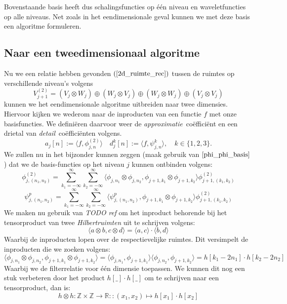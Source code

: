 \documentclass[11pt]{uvamath}
\newcommand{\R}{\mathbb{R}}
\newcommand{\Z}{\mathbb{Z}}
\theoremstyle{plain}
\theoremstyle{definition}
\theoremstyle{remark}
\newcommand{\inpr}[2]{\langle #1 , #2 \rangle}
\begin{document}
Bovenstaande basis heeft dus schalingsfuncties op \'e\'en niveau en waveletfuncties op alle niveaus. Net zoals in het eendimensionale geval kunnen we met deze basis een algoritme formuleren.

\subsection{Naar een tweedimensionaal algoritme}
Nu we een relatie hebben gevonden $(\ref{2d_ruimte_rec})$ tussen de ruimtes op verschillende
niveau's volgens
\[
V_{j+1}^{(2)} = (V_j\otimes W_j) \oplus (W_j\otimes V_j) \oplus
(W_j\otimes W_j) \oplus (V_j\otimes V_j)
\]
kunnen we het eendimensionale algoritme uitbreiden naar twee dimensies.
Hiervoor kijken we wederom naar de inproducten van een functie $f$ met
onze basisfuncties.
We defini\"eren daarvoor weer de \emph{approximatie}~co\"effici\"ent en een drietal
van \emph{detail}~co\"effici\"enten volgens.
\[
a_j[n] := \langle f, \phi^{(2)}_{j,n} \rangle \quad d^k_j[n] := \langle f, \psi^k_{j,n} \rangle ,\quad k \in \{1,2,3\}.
\]
We zullen nu in het bijzonder kunnen zeggen (maak gebruik van $\ref{phi_phi_basis}$)
dat we de basis-functies op het niveau $j$ kunnen ontbinden volgens:
\begin{equation}
  \label{phi_phi_som}
  \phi^{(2)}_{j,(n_1,n_2)} = \sum_{k_1=-\infty}^\infty \sum_{k_2=-\infty}^\infty
  \inpr{\phi_{j,n_1}\otimes\phi_{j,n_2}}{\phi_{j+1,k_1}\otimes\phi_{j+1,k_2}}
  \phi^{(2)}_{j+1,(k_1,k_2)}
\end{equation}
\begin{equation}
  \label{psi_k_som}
  \psi^{p}_{j,(n_1,n_2)} = \sum_{k_1=-\infty}^\infty \sum_{k_2=-\infty}^\infty
  \inpr{\psi^p_{j,(n_1,n_2)}}{\phi_{j+1,k_1}\otimes\phi_{j+1,k_2}}
  \phi^{(2)}_{j+1,(k_1,k_2)}
\end{equation}
We maken nu gebruik van \emph{TODO ref} om het inproduct behorende bij het tensorproduct
van twee \emph{Hilbertruimten} uit te schrijven volgens:
\[
\inpr{a\otimes b}{c\otimes d} = \inpr{a}{c}\cdot \inpr{b}{d}
\]
Waarbij de inproducten lopen over de respectievelijke ruimtes.
Dit versimpelt de inproducten die we zoeken volgens:
\[
\inpr{\phi_{j,n_1}\otimes\phi_{j,n_2}}{\phi_{j+1,k_1}\otimes\phi_{j+1,k_2}}
=\inpr{\phi_{j,n_1}}{\phi_{j+1,k_1}}\inpr{\phi_{j,n_2}}{\phi_{j+1,k_2}}
=h[k_1-2n_1]\cdot h[k_2-2n_2]
\]
Waarbij we de filterrelatie voor \'e\'en dimensie toepassen. We kunnen dit nog een
stuk verbeteren door het product $h[\_]\cdot h[\_]$ om te schrijven naar een tensorproduct,
dan is:
\[
h\otimes h : \Z\times\Z \to \R :: (x_1,x_2) \mapsto h[x_1]\cdot h[x_2]
\]
\end{document}
